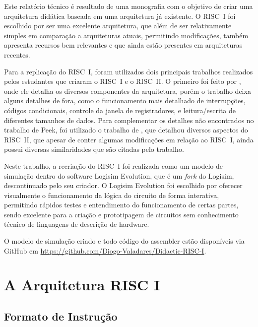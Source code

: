 \documentclass[
	article,			%
	11pt,				%
	oneside,			%
	a4paper,			%
	english,			%
	brazil,				%
	sumario=tradicional
	]{abntex2}
\begin{document}
Este relatório técnico é resultado de uma monografia com o objetivo de criar uma arquitetura didática baseada em uma arquitetura já existente. O RISC~I foi escolhido por ser uma excelente arquitetura, que além de ser relativamente simples em comparação a arquiteturas atuais, permitindo modificações, também apresenta recursos bem relevantes e que ainda estão presentes em arquiteturas recentes.

Para a replicação do RISC~I, foram utilizados dois principais trabalhos realizados pelos estudantes que criaram o RISC~I e o RISC~II. O primeiro foi feito por , onde ele detalha os diversos componentes da arquitetura, porém o trabalho deixa alguns detalhes de fora, como o funcionamento mais detalhado de interrupções, códigos condicionais, controle da janela de registradores, e leitura/escrita de diferentes tamanhos de dados. Para complementar os detalhes não encontrados no trabalho de Peek, foi utilizado o trabalho de , que detalhou diversos aspectos do RISC~II, que apesar de conter algumas modificações em relação ao RISC~I, ainda possui diversas similaridades que são citadas pelo trabalho.

Neste trabalho, a recriação do RISC~I foi realizada como um modelo de simulação dentro do software Logisim Evolution, que é um \textit{fork} do Logisim, descontinuado pelo seu criador. O Logisim Evolution foi escolhido por oferecer visualmente o funcionamento da lógica do circuito de forma interativa, permitindo rápidos testes e entendimento do funcionamento de certas partes, sendo excelente para a criação e prototipagem de circuitos sem conhecimento técnico de linguagens de descrição de hardware.

O modelo de simulação criado e todo código do assembler estão disponíveis via GitHub em \href{https://github.com/Diogo-Valadares/Didactic-RISC-I}{https://github.com/Diogo-Valadares/Didactic-RISC-I}. 

\section{A Arquitetura RISC I}

\subsection{Formato de Instrução}
\end{document}
